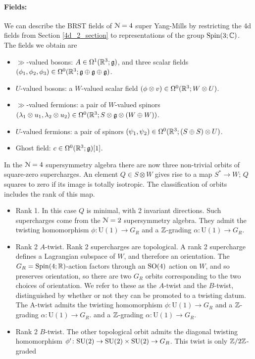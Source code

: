 \documentclass[10pt, oneside]{article}
\renewcommand{\U}{\mathrm{U}}
\begin{document}
\paragraph{Fields:}We can describe the BRST fields of $\mathcal{N}=4$ super Yang-Mills by restricting the 4d fields from Section \ref{4d_2_section} to representations of the group $\mathrm{Spin}(3;\mathbb C)$.  The fields we obtain are
\begin{itemize}
 \item $\gg$-valued bosons: $A \in \Omega^1(\mathbb R^3; \mathfrak{g})$, and three scalar fields $(\phi_1,\phi_2,\phi_3) \in \Omega^0(\mathbb R^3; \mathfrak{g} \oplus \mathfrak{g} \oplus \mathfrak{g})$.
 \item $U$-valued bosons: a $W$-valued scalar field $(\phi \otimes v) \in \Omega^0(\mathbb R^3; W \otimes U)$.
 \item $\gg$-valued fermions: a pair of $W$-valued spinors $(\lambda_1 \otimes u_1, \lambda_2 \otimes u_2) \in \Omega^0(\mathbb R^3 ; S \otimes \mathfrak{g} \otimes (W \oplus W))$.
 \item $U$-valued fermions:  a pair of spinors $(\psi_1,\psi_2) \in \Omega^0(\mathbb R^3; (S\oplus S) \otimes U)$.
 \item Ghost field: $c \in \Omega^0(\mathbb R^3; \mathfrak{g})[1]$.
\end{itemize}

In the $\mathcal{N}=4$ supersymmetry algebra there are now three non-trivial orbits of square-zero supercharges.  An element $Q \in S \otimes W$ gives rise to a map $S^* \to W$; $Q$ squares to zero if its image is totally isotropic.  The classification of orbits includes the rank of this map.
\begin{itemize}
 \item Rank 1.  In this case $Q$ is minimal, with 2 invariant directions.  Such supercharges come from the $\mathcal{N}=2$ supersymmetry algebra.  They admit the twisting homomorphism $\phi \colon \U(1) \to G_R$ and a $\mathbb Z$-grading $\alpha \colon \U(1) \to G_R$.
 \item Rank 2 $A$-twist.  Rank 2 supercharges are topological.  A rank 2 supercharge defines a Lagrangian subspace of $W$, and therefore an orientation.  The $G_R = \mathrm{Spin}(4;\mathbb R)$-action factors through an $\mathrm{SO}(4)$ action on $W$, and so preserves orientation, so there are two $G_R$ orbits corresponding to the two choices of orientation.  We refer to these as the $A$-twist and the $B$-twist, distinguished by whether or not they can be promoted to a twisting datum.  The A-twist admits the twisting homomorphism $\phi \colon \U(1) \to G_R$ and a $\mathbb Z$-grading $\alpha \colon \U(1) \to G_R$. and a $\mathbb Z$-grading $\alpha \colon \U(1) \to G_R$.
 \item Rank 2 $B$-twist.  The other topological orbit admits the diagonal twisting homomorphism $\phi' \colon \mathrm{SU}(2) \to \mathrm{SU}(2) \times \mathrm{SU}(2) \to G_R$.  This twist is only $\mathbb Z/2\mathbb Z$-graded
\end{itemize}
\end{document}
